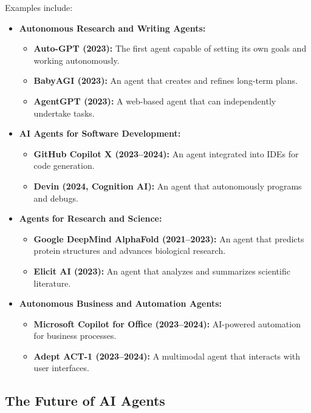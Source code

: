Examples include:
\begin{itemize}
  \item \textbf{Autonomous Research and Writing Agents:}
    \begin{itemize}
      \item \textbf{Auto-GPT (2023):} The first agent capable of setting its own goals and working
            autonomously.
      \item \textbf{BabyAGI (2023):} An agent that creates and refines long-term plans.
      \item \textbf{AgentGPT (2023):} A web-based agent that can independently undertake tasks.
    \end{itemize}
  \item \textbf{AI Agents for Software Development:}
    \begin{itemize}
      \item \textbf{GitHub Copilot X (2023--2024):} An agent integrated into IDEs for code generation.
      \item \textbf{Devin (2024, Cognition AI):} An agent that autonomously programs and debugs.
    \end{itemize}
  \item \textbf{Agents for Research and Science:}
    \begin{itemize}
      \item \textbf{Google DeepMind AlphaFold (2021--2023):} An agent that predicts protein
            structures and advances biological research.
      \item \textbf{Elicit AI (2023):} An agent that analyzes and summarizes scientific literature.
    \end{itemize}
  \item \textbf{Autonomous Business and Automation Agents:}
    \begin{itemize}
      \item \textbf{Microsoft Copilot for Office (2023--2024):} AI-powered automation for business
            processes.
      \item \textbf{Adept ACT-1 (2023--2024):} A multimodal agent that interacts with user interfaces.
    \end{itemize}
\end{itemize}

\subsection{The Future of AI Agents}

